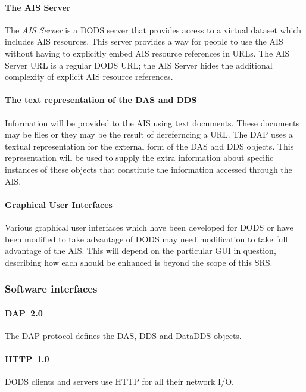\documentclass{article}
\begin{document}
\cbstart
\paragraph{The AIS Server}
\label{sec:ais-server}
The \emph{AIS Server} is a DODS server that provides access to a virtual
dataset which includes \ac{AIS} resources. This server provides a way for
people to use the \ac{AIS} without having to explicitly embed \ac{AIS}
resource references in  URLs. The \ac{AIS} Server URL is a regular DODS URL;
the AIS Server hides the additional complexity of explicit AIS resource
references. \cbend

\paragraph{The text representation of the \ac{DAS} and \ac{DDS}}
\label{sec:ui:text-das-dds}
Information will be provided to the \ac{AIS} using text \cbstart documents.
These documents may be files or they may be the result of dereferncing a URL.
\cbend The \ac{DAP} uses a textual representation for the external form of
the \ac{DAS} and \ac{DDS} objects. This representation will be used to supply
the extra information about specific instances of these objects that
constitute the information accessed through the \ac{AIS}.

\paragraph{Graphical User Interfaces}
Various graphical user interfaces which have been developed for \ac{DODS} or
have been modified to take advantage of \ac{DODS} \cbstart may need
modification to take full advantage of the \ac{AIS}. This will depend on the
particular GUI in question, describing how each should be enhanced is beyond
the scope of this \ac{SRS}.\cbend

\subsubsection{Software interfaces}
\paragraph{DAP~2.0} 
The \ac{DAP} protocol defines the \ac{DAS}, \ac{DDS} and \ac{DataDDS} objects.
\paragraph{HTTP~1.0} 
\ac{DODS} clients and servers use \ac{HTTP} for all their network I/O.
\end{document}
